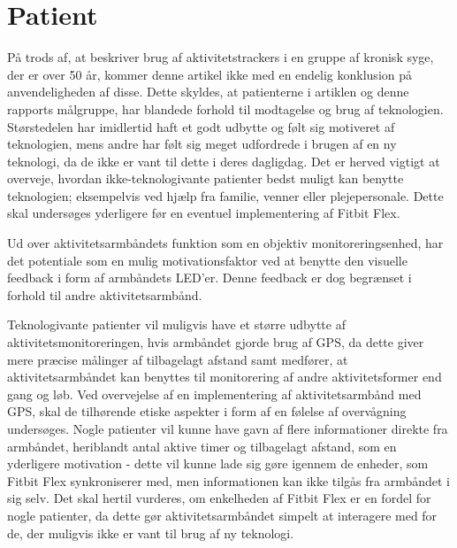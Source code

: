 \section{Patient} \label{sec:dis_patient}
På trods af, at \citeauthor{mercer2016} beskriver brug af aktivitetstrackers i en gruppe af kronisk syge, der er over 50 år, kommer denne artikel ikke med en endelig konklusion på anvendeligheden af disse. Dette skyldes, at patienterne i artiklen og denne rapports målgruppe, har blandede forhold til modtagelse og brug af teknologien. Størstedelen har imidlertid haft et godt udbytte og følt sig motiveret af teknologien, mens andre har følt sig meget udfordrede i brugen af en ny teknologi, da de ikke er vant til dette i deres dagligdag. Det er herved vigtigt at overveje, hvordan ikke-teknologivante patienter bedst muligt kan benytte teknologien; eksempelvis ved hjælp fra familie, venner eller plejepersonale. Dette skal undersøges yderligere før en eventuel implementering af Fitbit Flex. 

Ud over aktivitetsarmbåndets funktion som en objektiv monitoreringsenhed, har det potentiale som en mulig motivationsfaktor ved at benytte den visuelle feedback i form af armbåndets LED'er. Denne feedback er dog begrænset i forhold til andre aktivitetsarmbånd. 

Teknologivante patienter vil muligvis have et større udbytte af aktivitetsmonitoreringen, hvis armbåndet gjorde brug af GPS, da dette giver mere præcise målinger af tilbagelagt afstand samt medfører, at aktivitetsarmbåndet kan benyttes til monitorering af andre aktivitetsformer end gang og løb. Ved overvejelse af en implementering af aktivitetsarmbånd med GPS, skal de tilhørende etiske aspekter i form af en følelse af overvågning undersøges.
Nogle patienter vil kunne have gavn af flere informationer direkte fra armbåndet, heriblandt antal aktive timer og tilbagelagt afstand, som en yderligere motivation - dette vil kunne lade sig gøre igennem de enheder, som Fitbit Flex synkroniserer med, men informationen kan ikke tilgås fra armbåndet i sig selv. Det skal hertil vurderes, om enkelheden af Fitbit Flex er en fordel for nogle patienter, da dette gør aktivitetsarmbåndet simpelt at interagere med for de, der muligvis ikke er vant til brug af ny teknologi. 

